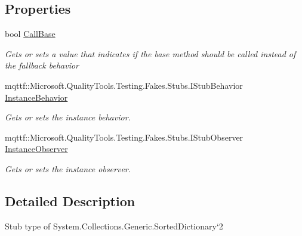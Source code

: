 \subsection*{Properties}
\begin{DoxyCompactItemize}
\item 
bool \hyperlink{class_system_1_1_collections_1_1_generic_1_1_fakes_1_1_stub_sorted_dictionary_3_01_t_key_00_01_t_value_01_4_ac206d76fad4532a1030599b81a0a4bae}{Call\-Base}
\begin{DoxyCompactList}\small\item\em Gets or sets a value that indicates if the base method should be called instead of the fallback behavior\end{DoxyCompactList}\item 
mqttf\-::\-Microsoft.\-Quality\-Tools.\-Testing.\-Fakes.\-Stubs.\-I\-Stub\-Behavior \hyperlink{class_system_1_1_collections_1_1_generic_1_1_fakes_1_1_stub_sorted_dictionary_3_01_t_key_00_01_t_value_01_4_a027ba65186839a6f67978e4b5b506f2e}{Instance\-Behavior}
\begin{DoxyCompactList}\small\item\em Gets or sets the instance behavior.\end{DoxyCompactList}\item 
mqttf\-::\-Microsoft.\-Quality\-Tools.\-Testing.\-Fakes.\-Stubs.\-I\-Stub\-Observer \hyperlink{class_system_1_1_collections_1_1_generic_1_1_fakes_1_1_stub_sorted_dictionary_3_01_t_key_00_01_t_value_01_4_a07bde3676aee9ec543b16005d0ee7f89}{Instance\-Observer}
\begin{DoxyCompactList}\small\item\em Gets or sets the instance observer.\end{DoxyCompactList}\end{DoxyCompactItemize}


\subsection{Detailed Description}
Stub type of System.\-Collections.\-Generic.\-Sorted\-Dictionary`2



